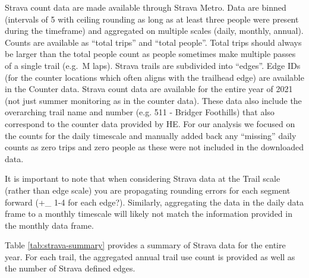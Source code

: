 \documentclass[
]{book}
\begin{document}
Strava count data are made available through Strava Metro. Data are
binned (intervals of 5 with ceiling rounding as long as at least three
people were present during the timeframe) and aggregated on multiple
scales (daily, monthly, annual). Counts are available as ``total trips''
and ``total people''. Total trips should always be larger than the total
people count as people sometimes make multiple passes of a single trail
(e.g.~M laps). Strava trails are subdivided into ``edges''. Edge IDs (for
the counter locations which often aligns with the trailhead edge) are
available in the Counter data. Strava count data are available for the
entire year of 2021 (not just summer monitoring as in the counter data).
These data also include the overarching trail name and number (e.g.
511 - Bridger Foothills) that also correspond to the counter data
provided by HE. For our analysis we focused on the counts for the daily
timescale and manually added back any ``missing'' daily counts as zero
trips and zero people as these were not included in the downloaded data.

It is important to note that when considering Strava data at the Trail
scale (rather than edge scale) you are propagating rounding errors for
each segment forward (+\_ 1-4 for each edge?). Similarly, aggregating
the data in the daily data frame to a monthly timescale will likely not
match the information provided in the monthly data frame.

Table \ref{tab:strava-summary} provides a summary of Strava data for
the entire year. For each trail, the aggregated annual trail use count
is provided as well as the number of Strava defined edges.
\end{document}
